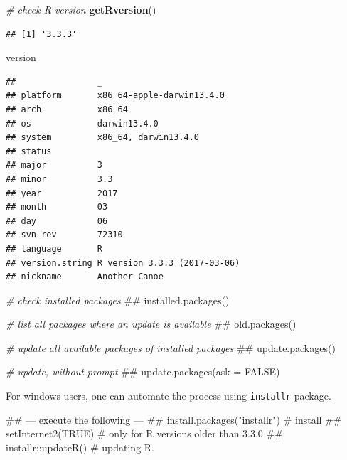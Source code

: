 \documentclass[]{book}
\newenvironment{Shaded}{\begin{snugshade}}{\end{snugshade}}
\newcommand{\KeywordTok}[1]{\textcolor[rgb]{0.13,0.29,0.53}{\textbf{{#1}}}}
\newcommand{\CommentTok}[1]{\textcolor[rgb]{0.56,0.35,0.01}{\textit{{#1}}}}
\newcommand{\NormalTok}[1]{{#1}}
\theoremstyle{definition}
\theoremstyle{definition}
\theoremstyle{remark}
\begin{document}
\begin{Shaded}
\begin{Highlighting}[]
\CommentTok{# check R version}
\KeywordTok{getRversion}\NormalTok{()}
\end{Highlighting}
\end{Shaded}

\begin{verbatim}
## [1] '3.3.3'
\end{verbatim}

\begin{Shaded}
\begin{Highlighting}[]
\NormalTok{version}
\end{Highlighting}
\end{Shaded}

\begin{verbatim}
##                _                           
## platform       x86_64-apple-darwin13.4.0   
## arch           x86_64                      
## os             darwin13.4.0                
## system         x86_64, darwin13.4.0        
## status                                     
## major          3                           
## minor          3.3                         
## year           2017                        
## month          03                          
## day            06                          
## svn rev        72310                       
## language       R                           
## version.string R version 3.3.3 (2017-03-06)
## nickname       Another Canoe
\end{verbatim}

\begin{Shaded}
\begin{Highlighting}[]
\CommentTok{# check installed packages}
\NormalTok{## installed.packages()}

\CommentTok{# list all packages where an update is available}
\NormalTok{## old.packages()}

\CommentTok{# update all available packages of installed packages }
\NormalTok{## update.packages()}

\CommentTok{# update, without prompt}
\NormalTok{## update.packages(ask = FALSE)}
\end{Highlighting}
\end{Shaded}

For windows users, one can automate the process using \texttt{installr}
package.

\begin{Shaded}
\begin{Highlighting}[]
\NormalTok{## --- execute the following ---}
\NormalTok{## install.packages("installr") # install}
\NormalTok{## setInternet2(TRUE) # only for R versions older than 3.3.0}
\NormalTok{## installr::updateR() # updating R.}
\end{Highlighting}
\end{Shaded}
\end{document}
